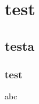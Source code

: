 \documentclass{beamer}
\begin{document}
\section{test}
\subsection{testa}
\begin{frame}
\frametitle{test}
    abc
\end{frame} 
\end{document}
